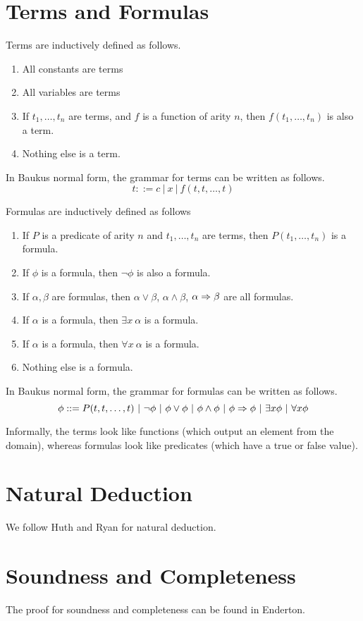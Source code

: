 \section{Terms and Formulas}
\begin{definition}
Terms are inductively defined as follows.
\begin{enumerate}
\item All constants are terms
\item All variables are terms
\item If $t_1,\dots, t_n$ are terms, and $f$ is a function of arity $n$, then $f(t_1,\dots, t_n)$ is also a term.
\item Nothing else is a term.
\end{enumerate}

In Baukus normal form, the grammar for terms can be written as follows.
\[
t ::= c ~|~ x ~|~ f(t,t,\dots,t)
\]
\end{definition}
\begin{definition}
Formulas are inductively defined as follows
\begin{enumerate}
\item If $P$ is a predicate of arity $n$ and $t_1,\dots,t_n$ are terms, then $P(t_1,\dots,t_n)$ is a formula.
\item If $\phi$ is a formula, then $\neg \phi$ is also a formula.
\item If $\alpha, \beta$ are formulas, then $\alpha \vee \beta$, $\alpha \wedge \beta$, $\alpha \Rightarrow \beta$ are all formulas.
\item If $\alpha$ is a formula, then $\exists x ~\alpha$ is a formula.
\item If $\alpha$ is a formula, then $\forall x ~\alpha$ is a formula.
\item Nothing else is a formula.
\end{enumerate}
In Baukus normal form, the grammar for formulas can be written as follows.
\[
\phi ::= P(t,t,\dots,t) ~|~ \neg \phi ~|~ \phi \vee \phi ~|~ \phi \wedge \phi ~|~ \phi \Rightarrow \phi ~|~  \exists x \phi ~|~ \forall x \phi 
\]
\end{definition}

Informally, the terms look like functions (which output an element from the domain), whereas formulas look like predicates (which have a true or false value).

\section{Natural Deduction}
We follow Huth and Ryan for natural deduction.

\section{Soundness and Completeness}
The proof for soundness and completeness can be found in Enderton.